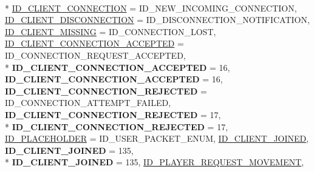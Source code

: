 \begin{DoxyCompactItemize}
\\*
\hyperlink{namespace_champ_net_plugin_a2ade5cfa7cf6c25ab7236c6b54a57821aecc0564c52e3106cfe012e5533b080da}{I\-D\-\_\-\-C\-L\-I\-E\-N\-T\-\_\-\-C\-O\-N\-N\-E\-C\-T\-I\-O\-N} = I\-D\-\_\-\-N\-E\-W\-\_\-\-I\-N\-C\-O\-M\-I\-N\-G\-\_\-\-C\-O\-N\-N\-E\-C\-T\-I\-O\-N, 
\hyperlink{namespace_champ_net_plugin_a2ade5cfa7cf6c25ab7236c6b54a57821a2ed0fbbbbe782bca6c76277c89050ad9}{I\-D\-\_\-\-C\-L\-I\-E\-N\-T\-\_\-\-D\-I\-S\-C\-O\-N\-N\-E\-C\-T\-I\-O\-N} = I\-D\-\_\-\-D\-I\-S\-C\-O\-N\-N\-E\-C\-T\-I\-O\-N\-\_\-\-N\-O\-T\-I\-F\-I\-C\-A\-T\-I\-O\-N, 
\hyperlink{namespace_champ_net_plugin_a2ade5cfa7cf6c25ab7236c6b54a57821a31932f93b241ffddf903d32af0fc2155}{I\-D\-\_\-\-C\-L\-I\-E\-N\-T\-\_\-\-M\-I\-S\-S\-I\-N\-G} = I\-D\-\_\-\-C\-O\-N\-N\-E\-C\-T\-I\-O\-N\-\_\-\-L\-O\-S\-T, 
\hyperlink{namespace_champ_net_plugin_a2ade5cfa7cf6c25ab7236c6b54a57821a0295101371b4a70a1c007a4f6e206e1d}{I\-D\-\_\-\-C\-L\-I\-E\-N\-T\-\_\-\-C\-O\-N\-N\-E\-C\-T\-I\-O\-N\-\_\-\-A\-C\-C\-E\-P\-T\-E\-D} = I\-D\-\_\-\-C\-O\-N\-N\-E\-C\-T\-I\-O\-N\-\_\-\-R\-E\-Q\-U\-E\-S\-T\-\_\-\-A\-C\-C\-E\-P\-T\-E\-D, 
\\*
{\bfseries I\-D\-\_\-\-C\-L\-I\-E\-N\-T\-\_\-\-C\-O\-N\-N\-E\-C\-T\-I\-O\-N\-\_\-\-A\-C\-C\-E\-P\-T\-E\-D} = 16, 
{\bfseries I\-D\-\_\-\-C\-L\-I\-E\-N\-T\-\_\-\-C\-O\-N\-N\-E\-C\-T\-I\-O\-N\-\_\-\-A\-C\-C\-E\-P\-T\-E\-D} = 16, 
{\bfseries I\-D\-\_\-\-C\-L\-I\-E\-N\-T\-\_\-\-C\-O\-N\-N\-E\-C\-T\-I\-O\-N\-\_\-\-R\-E\-J\-E\-C\-T\-E\-D} = I\-D\-\_\-\-C\-O\-N\-N\-E\-C\-T\-I\-O\-N\-\_\-\-A\-T\-T\-E\-M\-P\-T\-\_\-\-F\-A\-I\-L\-E\-D, 
{\bfseries I\-D\-\_\-\-C\-L\-I\-E\-N\-T\-\_\-\-C\-O\-N\-N\-E\-C\-T\-I\-O\-N\-\_\-\-R\-E\-J\-E\-C\-T\-E\-D} = 17, 
\\*
{\bfseries I\-D\-\_\-\-C\-L\-I\-E\-N\-T\-\_\-\-C\-O\-N\-N\-E\-C\-T\-I\-O\-N\-\_\-\-R\-E\-J\-E\-C\-T\-E\-D} = 17, 
\hyperlink{namespace_champ_net_plugin_a2ade5cfa7cf6c25ab7236c6b54a57821a6acf78ef40fd50b2e823237ea828fc1b}{I\-D\-\_\-\-P\-L\-A\-C\-E\-H\-O\-L\-D\-E\-R} = I\-D\-\_\-\-U\-S\-E\-R\-\_\-\-P\-A\-C\-K\-E\-T\-\_\-\-E\-N\-U\-M, 
\hyperlink{namespace_champ_net_plugin_a2ade5cfa7cf6c25ab7236c6b54a57821aeb7ac0bb4cb955cc0b7a3bebc9f14774}{I\-D\-\_\-\-C\-L\-I\-E\-N\-T\-\_\-\-J\-O\-I\-N\-E\-D}, 
{\bfseries I\-D\-\_\-\-C\-L\-I\-E\-N\-T\-\_\-\-J\-O\-I\-N\-E\-D} = 135, 
\\*
{\bfseries I\-D\-\_\-\-C\-L\-I\-E\-N\-T\-\_\-\-J\-O\-I\-N\-E\-D} = 135, 
\hyperlink{namespace_champ_net_plugin_a2ade5cfa7cf6c25ab7236c6b54a57821abaa5b813ea0118cdccbb8f80d461fea8}{I\-D\-\_\-\-P\-L\-A\-Y\-E\-R\-\_\-\-R\-E\-Q\-U\-E\-S\-T\-\_\-\-M\-O\-V\-E\-M\-E\-N\-T}, 

\end{DoxyCompactItemize}
